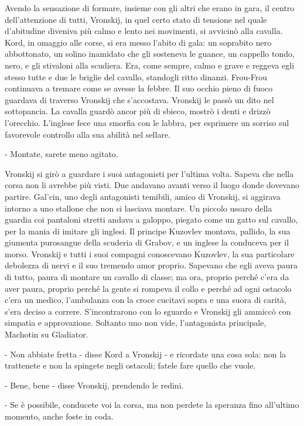 Avendo la sensazione di formare, insieme con gli altri che erano in gara, il centro dell'attenzione di tutti, Vronskij, in quel certo stato di tensione nel quale d'abitudine diveniva più calmo e lento nei movimenti, si avvicinò alla cavalla. Kord, in omaggio alle corse, si era messo l'abito di gala: un soprabito nero abbottonato, un solino inamidato che gli sosteneva le guance, un cappello tondo, nero, e gli stivaloni alla scudiera. Era, come sempre, calmo e grave e reggeva egli stesso tutte e due le briglie del cavallo, standogli ritto dinanzi. Frou-Frou continuava a tremare come se avesse la febbre. Il suo occhio pieno di fuoco guardava di traverso Vronskij che s'accostava. Vronskij le passò un dito nel sottopancia. La cavalla guardò ancor più di sbieco, mostrò i denti e drizzò l'orecchio. L'inglese fece una smorfia con le labbra, per esprimere un sorriso sul favorevole controllo alla sua abilità nel sellare. 

- Montate, sarete meno agitato. 

Vronskij si girò a guardare i suoi antagonisti per l'ultima volta. Sapeva che nella corsa non li avrebbe più visti. Due andavano avanti verso il luogo donde dovevano partire. Gal'cin, uno degli antagonisti temibili, amico di Vronskij, si aggirava intorno a uno stallone che non si lasciava montare. Un piccolo ussaro della guardia coi pantaloni stretti andava a galoppo, piegato come un gatto sul cavallo, per la mania di imitare gli inglesi. Il principe Kuzovlev montava, pallido, la sua giumenta purosangue della scuderia di Grabov, e un inglese la conduceva per il morso. Vronskij e tutti i suoi compagni conoscevano Kuzovlev, la sua particolare debolezza di nervi e il suo tremendo amor proprio. Sapevano che egli aveva paura di tutto, paura di montare un cavallo di classe; ma ora, proprio perché c'era da aver paura, proprio perché la gente si rompeva il collo e perché ad ogni ostacolo c'era un medico, l'ambulanza con la croce cucitavi sopra e una suora di carità, s'era deciso a correre. S'incontrarono con lo sguardo e Vronskij gli ammiccò con simpatia e approvazione. Soltanto uno non vide, l'antagonista principale, Machotin su Gladiator. 

- Non abbiate fretta - disse Kord a Vronskij - e ricordate una cosa sola: non la trattenete e non la spingete negli ostacoli; fatele fare quello che vuole. 

- Bene, bene - disse Vronskij, prendendo le redini. 

- Se è possibile, conducete voi la corsa, ma non perdete la speranza fino all'ultimo momento, anche foste in coda. 


